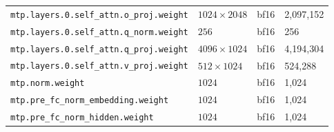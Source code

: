 \documentclass[10pt,a4paper]{article}
\theoremstyle{definition}
\begin{document}
\begin{longtable}{p{8.5cm}lll}
\texttt{mtp.\allowbreak{}layers.\allowbreak{}0.\allowbreak{}self\_attn.\allowbreak{}o\_proj.\allowbreak{}weight} & $1024 \times 2048$ & bf16 & 2,097,152 \\
\texttt{mtp.\allowbreak{}layers.\allowbreak{}0.\allowbreak{}self\_attn.\allowbreak{}q\_norm.\allowbreak{}weight} & $256$ & bf16 & 256 \\
\texttt{mtp.\allowbreak{}layers.\allowbreak{}0.\allowbreak{}self\_attn.\allowbreak{}q\_proj.\allowbreak{}weight} & $4096 \times 1024$ & bf16 & 4,194,304 \\
\texttt{mtp.\allowbreak{}layers.\allowbreak{}0.\allowbreak{}self\_attn.\allowbreak{}v\_proj.\allowbreak{}weight} & $512 \times 1024$ & bf16 & 524,288 \\
\texttt{mtp.\allowbreak{}norm.\allowbreak{}weight} & $1024$ & bf16 & 1,024 \\
\texttt{mtp.\allowbreak{}pre\_fc\_norm\_embedding.\allowbreak{}weight} & $1024$ & bf16 & 1,024 \\
\texttt{mtp.\allowbreak{}pre\_fc\_norm\_hidden.\allowbreak{}weight} & $1024$ & bf16 & 1,024 \\
\end{longtable}
\end{document}
